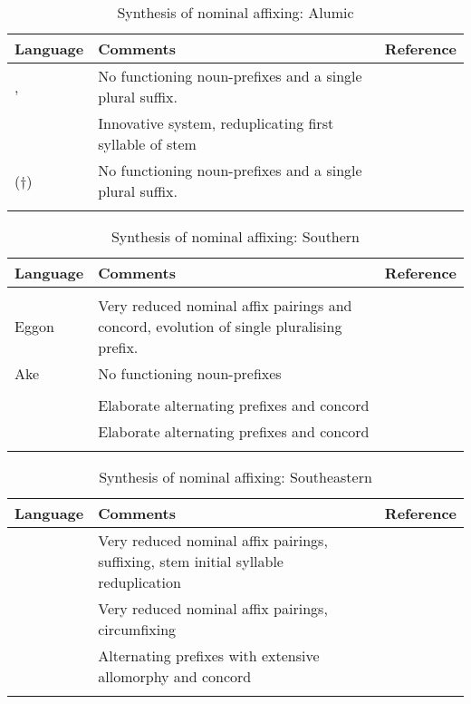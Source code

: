 \documentclass[output=paper]{langsci/langscibook}
\begin{document}
\begin{table}
\caption{Synthesis of nominal affixing: Alumic}
\small
\begin{tabularx}{\textwidth}{lQl}
\lsptoprule
 Language 	& Comments 	&   Reference\\
\midrule
{},  	& No functioning noun-prefixes and a single plural suffix.  	& \\
\tablevspace
{} 	& Innovative system, reduplicating first syllable of stem 	& \\
\tablevspace
{} (†) 	& No functioning noun-prefixes and a single plural suffix. 	& \\
\lspbottomrule
\end{tabularx} 
\end{table}


\begin{table}
\caption{Synthesis of nominal affixing: Southern}
\small
\begin{tabularx}{\textwidth}{lQp{3.4cm}}
\lsptoprule
 Language 	& Comments 	&   Reference\\
\midrule
\textbf{}\\
\midrule
{Eggon} 	& Very reduced nominal affix pairings and concord, evolution of single pluralising prefix. 	& \citet{Maddieson1982,Maddiesonnda,Sibomana1985} \\
\tablevspace
{Ake} 	& No functioning noun-prefixes 	& \\
\midrule
\textbf{}\\
\midrule
{} 	& Elaborate alternating prefixes and concord 	& \citet{Stofberg1978}\\
\tablevspace
{} 	& Elaborate alternating prefixes and concord 	& \\
\lspbottomrule
\end{tabularx} 
\end{table}

\begin{table}
\caption{Synthesis of nominal affixing: Southeastern}
\small
\begin{tabularx}{\textwidth}{lQl}
\lsptoprule
 Language 	& Comments 	&   Reference\\
\midrule
{} 	& Very reduced nominal affix pairings, suffixing, stem initial syllable reduplication 	& \citet{Nettle1998a}\\
\tablevspace
{} 	& Very reduced nominal affix pairings, circumfixing 	& \citet{Nettle1998b}\\
\tablevspace
{} 	& Alternating prefixes with extensive allomorphy and concord 	& \citet{Nettle1998b} \\
\lspbottomrule
\end{tabularx} 
\end{table}
\end{document}
